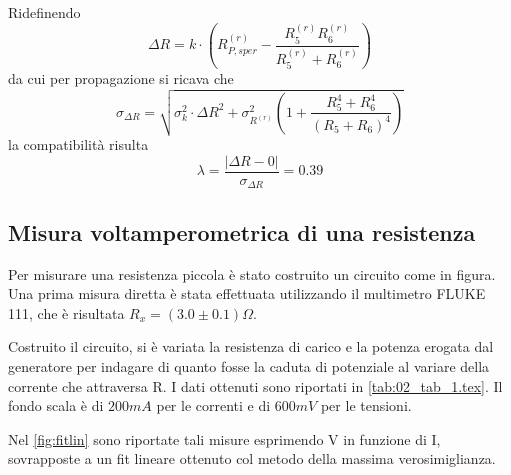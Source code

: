 Ridefinendo \[\Delta R = k \cdot \left(R^{(r)}_{P,sper} - \frac{R_5^{(r)} R_6^{(r)}} {R_5^{(r)} + R_6^{(r)}} \right)\] da cui per propagazione si ricava che 
\[ \sigma_{\Delta R} = 
        \sqrt{ 
               \sigma _k^2 \cdot \Delta R^2 + 
               \sigma _{R^{(r)}}^2 \left(1+\frac{R_5^4 + R_6^4}
                                         {(R_5 + R_6)^4} \right)
        }\]
la compatibilit\`a risulta
\[\lambda=\frac{\left|\Delta R - 0\right|}{\sigma_{\Delta R}}=0.39\]







 











\subsection{Misura voltamperometrica di una resistenza}
Per misurare una resistenza piccola \`e stato costruito un circuito come in figura. Una prima misura diretta \`e stata effettuata utilizzando il multimetro FLUKE 111, che \`e risultata $R_x=(3.0 \pm 0.1) \Omega$. 

Costruito il circuito, si \`e variata la resistenza di carico e la potenza erogata dal generatore per indagare di quanto fosse la caduta di potenziale al variare della corrente che attraversa R. I dati ottenuti sono riportati in \autoref{tab:02_tab_1.tex}. Il fondo scala \`e di $200mA$ per le correnti e di $600mV$ per le tensioni.

\begin{tabella}
	\centering
	
	\caption{Misure caduta di potenziale}
	\label{tab:02_tab_1.tex}
\end{tabella}

Nel \autoref{fig:fitlin} sono riportate tali misure esprimendo V in funzione di I, sovrapposte a un fit lineare ottenuto col metodo della massima verosimiglianza.

\begin{grafico}
\centering

\caption{Fit lineare}
\label{fig:fitlin}
\end{grafico}

